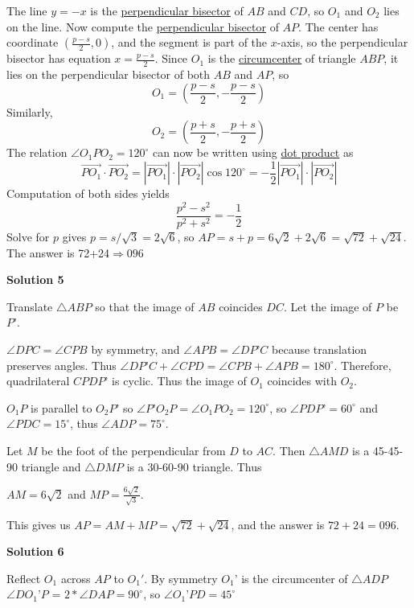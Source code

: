 \begin{enumerate}
 The line $y=-x$ is the \href{https://artofproblemsolving.com/wiki/index.php?title=Perpendicular\_bisector}{perpendicular bisector} of $AB$ and $CD$, so $O_1$ and $O_2$ lies on the line. Now compute the \href{https://artofproblemsolving.com/wiki/index.php?title=Perpendicular\_bisector}{perpendicular bisector} of $AP$. The center has coordinate $(\frac{p-s}{2},0)$, and the segment is part of the $x$-axis, so the perpendicular bisector has equation $x=\frac{p-s}{2}$. Since $O_1$ is the \href{https://artofproblemsolving.com/wiki/index.php?title=Circumcenter}{circumcenter} of triangle $ABP$, it lies on the perpendicular bisector of both $AB$ and $AP$, so
 \[O_1=(\frac{p-s}{2},-\frac{p-s}{2})\]Similarly, 
 \[O_2=(\frac{p+s}{2},-\frac{p+s}{2})\]The relation $\angle O_1PO_2=120^\circ$ can now be written using \href{https://artofproblemsolving.com/wiki/index.php?title=Vectors}{dot product} as
 \[\vec{PO_1}\cdot\vec{PO_2}=|\vec{PO_1}|\cdot|\vec{PO_2}|\cos 120^\circ=-\frac{1}{2}|\vec{PO_1}|\cdot|\vec{PO_2}|\]Computation of both sides yields
 \[\frac{p^2-s^2}{p^2+s^2}=-\frac{1}{2}\]Solve for $p$ gives $p=s/\sqrt{3}=2\sqrt{6}$, so $AP=s+p=6\sqrt{2}+2\sqrt{6}=\sqrt{72}+\sqrt{24}$. The answer is 72+24$\Rightarrow\boxed{096}$




\textbf{Solution 5}

Translate $\triangle{ABP}$ so that the image of $AB$ coincides $DC$. Let the image of $P$ be $P’$. 

 $\angle{DPC}=\angle{CPB}$ by symmetry, and $\angle{APB}=\angle{DP’C}$ because translation preserves angles. Thus $\angle{DP’C}+\angle{CPD}=\angle{CPB}+\angle{APB}=180^\circ$. Therefore, quadrilateral $CPDP’$ is cyclic. Thus the image of $O_1$ coincides with $O_2$. 

 $O_1P$ is parallel to $O_2P’$ so $\angle{P’O_2P}=\angle{O_1PO_2}=120^\circ$, so $\angle{PDP’}=60^\circ$ and $\angle{PDC}=15^\circ$, thus $\angle{ADP}=75^{\circ}$. 

 Let $M$ be the foot of the perpendicular from $D$ to $AC$. Then $\triangle{AMD}$ is a 45-45-90 triangle and $\triangle{DMP}$ is a 30-60-90 triangle. Thus

 $AM=6\sqrt{2}$ and $MP=\frac{6\sqrt{2}}{\sqrt{3}}$.

 This gives us $AP=AM+MP=\sqrt{72}+\sqrt{24}$, and the answer is $72+24=\boxed{096}.$




\textbf{Solution 6}

Reflect $O_1$ across $AP$ to $O_1'$. By symmetry $O_1’$ is the circumcenter of $\triangle{ADP}$
$\angle{DO_1’P}$ = $2*\angle{DAP} = 90^\circ$, so $\angle{O_1’PD}=45^\circ$


\end{enumerate}
